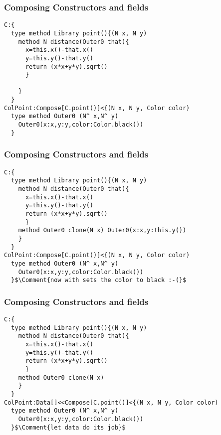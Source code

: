 \begin{frame}[fragile]
\frametitle{Composing Constructors and fields}


\begin{NiceCode}{59ex}{0.9}
\begin{lstlisting}
C:{
  type method Library point(){(N x, N y)
    method N distance(Outer0 that){
      x=this.x()-that.x()
      y=this.y()-that.y()
      return (x*x+y*y).sqrt()
      }

    }
  }
ColPoint:Compose[C.point()]<{(N x, N y, Color color)
  type method Outer0 (N^ x,N^ y)
    Outer0(x:x,y:y,color:Color.black())
  }
\end{lstlisting}
\end{NiceCode}
\end{frame}

\begin{frame}[fragile]
\frametitle{Composing Constructors and fields}
\addtocounter{framenumber}{-1}

\begin{NiceCode}{59ex}{0.9}
\begin{lstlisting}
C:{
  type method Library point(){(N x, N y)
    method N distance(Outer0 that){
      x=this.x()-that.x()
      y=this.y()-that.y()
      return (x*x+y*y).sqrt()
      }
    method Outer0 clone(N x) Outer0(x:x,y:this.y())
    }
  }
ColPoint:Compose[C.point()]<{(N x, N y, Color color)
  type method Outer0 (N^ x,N^ y)
    Outer0(x:x,y:y,color:Color.black())
  }$\Comment{now with sets the color to black :-(}$
\end{lstlisting}
\end{NiceCode}
\end{frame}

\begin{frame}[fragile]
\frametitle{Composing Constructors and fields}
\addtocounter{framenumber}{-1}

\begin{NiceCode}{59ex}{0.9}
\begin{lstlisting}
C:{
  type method Library point(){(N x, N y)
    method N distance(Outer0 that){
      x=this.x()-that.x()
      y=this.y()-that.y()
      return (x*x+y*y).sqrt()
      }
    method Outer0 clone(N x)
    }
  }
ColPoint:Data[]<<Compose[C.point()]<{(N x, N y, Color color)
  type method Outer0 (N^ x,N^ y)
    Outer0(x:x,y:y,color:Color.black())
  }$\Comment{let data do its job}$
\end{lstlisting}
\end{NiceCode}
\end{frame}


